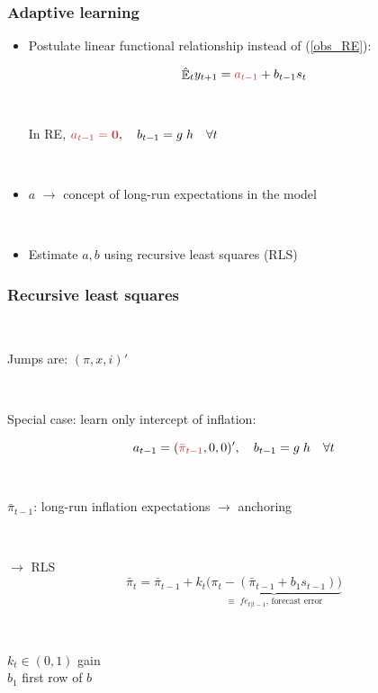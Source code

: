 \documentclass[10pt]{beamer}
\DeclareMathOperator{\E}{\mathbb{E}}
\begin{document}
\begin{frame}
	\frametitle{Adaptive learning}
	\label{adaptive_learning}

\begin{itemize}
\item Postulate linear functional relationship instead of (\ref{obs_RE}):

\begin{equation}
\hat{\E}_t y_{t+1} = \textcolor{brownreddark}{a_{t-1}} + b_{t-1}s_t  \label{PLM_fcst_general}
\end{equation}

\

\pause

In RE, $\textcolor{brownreddark}{a_{t-1} = \mathbf{0}}, \quad b_{t-1} = g\;h \quad \forall t$

\

\pause
  


\item[] \textcolor{brownreddark}{$a$}	$\rightarrow$ concept of long-run expectations in the model

\

\pause


\item Estimate $a, b$ using recursive least squares (RLS)


\end{itemize}


\end{frame}

\begin{frame}
	\frametitle{Recursive least squares}
	\label{RLS_special}
	
	\
	
Jumps are: $(\pi, x, i)'$ 	

\
\pause
\

Special case: learn only intercept of inflation:

\begin{equation}
a_{t-1} = ( \textcolor{brownreddark}{\bar{\pi}_{t-1}},0,0)', \quad b_{t-1} = g\; h \quad \forall t
\end{equation}

\
\pause
\

 \textcolor{brownreddark}{$\bar{\pi}_{t-1}$}: long-run inflation expectations $\rightarrow$ anchoring

\
\pause
\

$\rightarrow$ RLS
\begin{equation}
\bar{\pi}_{t}  =\bar{\pi}_{t-1} +k_t \underbrace{\big(\pi_{t} -(\bar{\pi}_{t-1}+b_1 s_{t-1}) \big)}_{\equiv \; fe_{t|t-1} \text{, forecast error} } 
\end{equation}
 
 \
 
 $k_t \in (0,1)$ gain \\
 $b_1$ first row of $b$
\vfill 

\hfill \hyperlink{RLS}{}




\end{frame}
\end{document}
